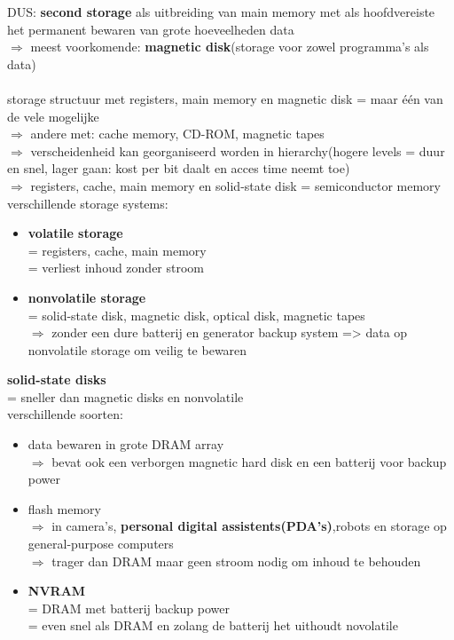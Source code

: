 \documentclass{report}
\begin{document}
DUS: \textbf{second storage} als uitbreiding van main memory met als hoofdvereiste het permanent bewaren van grote hoeveelheden data
\\ $\Rightarrow$ meest voorkomende: \textbf{magnetic disk}(storage voor zowel programma's als data)
\\
\\storage structuur met registers, main memory en magnetic disk = maar \'e\'en van de vele mogelijke
\\$\Rightarrow$ andere met: cache memory, CD-ROM, magnetic tapes
\\$\Rightarrow$ verscheidenheid kan georganiseerd worden in hierarchy(hogere levels = duur en snel, lager gaan: kost per bit daalt en acces time neemt toe)
\\$\Rightarrow$ registers, cache, main memory en solid-state disk = semiconductor memory
\\verschillende storage systems:
\begin{itemize}
\item \textbf{volatile storage}
\\= registers, cache, main memory
\\= verliest inhoud zonder stroom
\item \textbf{nonvolatile storage}
\\= solid-state disk, magnetic disk, optical disk, magnetic tapes
\\$\Rightarrow$ zonder een dure batterij en generator backup system => data op nonvolatile storage om veilig te bewaren
\end{itemize}
\textbf{solid-state disks}
\\ = sneller dan magnetic disks en nonvolatile
\\ verschillende soorten:
\begin{itemize}
\item data bewaren in grote DRAM array
\\$\Rightarrow$ bevat ook een verborgen magnetic hard disk en een batterij voor backup power
\item flash memory
\\ $\Rightarrow$ in camera's, \textbf{personal digital assistents(PDA's)},robots en storage op general-purpose computers
\\$\Rightarrow$ trager dan DRAM maar geen stroom nodig om inhoud te behouden
\item \textbf{NVRAM}
\\= DRAM met batterij backup power
\\= even snel als DRAM en zolang de batterij het uithoudt novolatile
\end{itemize}
\end{document}
